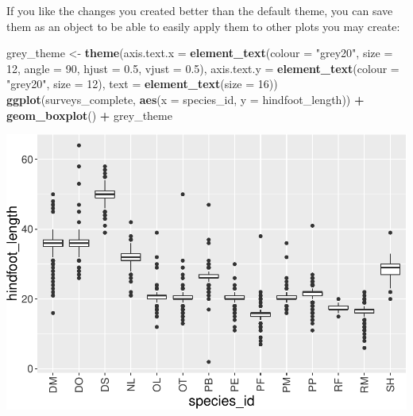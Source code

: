 \documentclass[]{book}
\newenvironment{Shaded}{\begin{snugshade}}{\end{snugshade}}
\newcommand{\KeywordTok}[1]{\textcolor[rgb]{0.13,0.29,0.53}{\textbf{#1}}}
\newcommand{\DataTypeTok}[1]{\textcolor[rgb]{0.13,0.29,0.53}{#1}}
\newcommand{\DecValTok}[1]{\textcolor[rgb]{0.00,0.00,0.81}{#1}}
\newcommand{\FloatTok}[1]{\textcolor[rgb]{0.00,0.00,0.81}{#1}}
\newcommand{\StringTok}[1]{\textcolor[rgb]{0.31,0.60,0.02}{#1}}
\newcommand{\OperatorTok}[1]{\textcolor[rgb]{0.81,0.36,0.00}{\textbf{#1}}}
\newcommand{\NormalTok}[1]{#1}
\begin{document}
If you like the changes you created better than the default theme, you
can save them as an object to be able to easily apply them to other
plots you may create:

\begin{Shaded}
\begin{Highlighting}[]
\NormalTok{grey_theme <-}\StringTok{ }\KeywordTok{theme}\NormalTok{(}\DataTypeTok{axis.text.x =} \KeywordTok{element_text}\NormalTok{(}\DataTypeTok{colour =} \StringTok{"grey20"}\NormalTok{, }\DataTypeTok{size =} \DecValTok{12}\NormalTok{, }\DataTypeTok{angle =} \DecValTok{90}\NormalTok{, }\DataTypeTok{hjust =} \FloatTok{0.5}\NormalTok{, }\DataTypeTok{vjust =} \FloatTok{0.5}\NormalTok{),}
                          \DataTypeTok{axis.text.y =} \KeywordTok{element_text}\NormalTok{(}\DataTypeTok{colour =} \StringTok{"grey20"}\NormalTok{, }\DataTypeTok{size =} \DecValTok{12}\NormalTok{),}
                          \DataTypeTok{text =} \KeywordTok{element_text}\NormalTok{(}\DataTypeTok{size =} \DecValTok{16}\NormalTok{))}
\KeywordTok{ggplot}\NormalTok{(surveys_complete, }\KeywordTok{aes}\NormalTok{(}\DataTypeTok{x =}\NormalTok{ species_id, }\DataTypeTok{y =}\NormalTok{ hindfoot_length)) }\OperatorTok{+}
\StringTok{    }\KeywordTok{geom_boxplot}\NormalTok{() }\OperatorTok{+}
\StringTok{    }\NormalTok{grey_theme}
\end{Highlighting}
\end{Shaded}

\includegraphics{img/R-ecology-number-species-year-with-right-labels-xfont-orientation-1.pdf}
\end{document}

